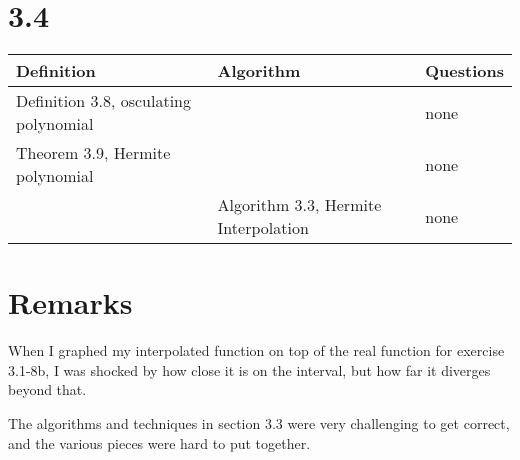 \documentclass{article}
\begin{document}
\section*{3.4}

\begin{tabularx}{\textwidth}{ |X|X|X| }
    \hline
	{\bf Definition} & {\bf Algorithm} & {\bf Questions} \\
    \hline
	Definition 3.8, osculating polynomial & & none \\
    \hline
	Theorem 3.9, Hermite polynomial & & none \\
    \hline
	 & Algorithm 3.3, Hermite Interpolation & none \\
    \hline
\end{tabularx}

\section*{Remarks}

When I graphed my interpolated function on top of the real function for exercise 3.1-8b, I was shocked by how close it is on the interval, but how far it diverges beyond that.

The algorithms and techniques in section 3.3 were very challenging to get correct, and the various pieces were hard to put together.
\end{document}

